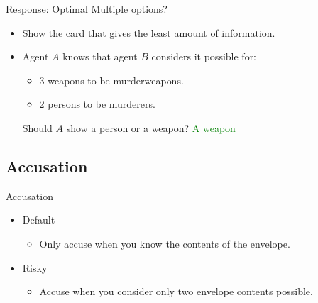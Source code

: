 \begin{frame}{Response: Optimal}
Multiple options?
  \begin{itemize}
  \item Show the card that gives the least amount of information.
  \item Agent $A$ knows that agent $B$ considers it possible for:
  \begin{itemize}
    \item 3 weapons to be murderweapons.
    \item 2 persons to be murderers. 
  \end{itemize}
  Should $A$ show a person or a weapon?  \textcolor{green}{A weapon}
  \end{itemize}
\end{frame}

\subsection{Accusation}
\begin{frame} {Accusation}
\begin{itemize}
  \item Default
  \begin{itemize}
   \item Only accuse when you know the contents of the envelope. 
  \end{itemize}
  
  \item Risky
  \begin{itemize}
  \item Accuse when you consider only two envelope contents possible.
  \end{itemize}

\end{itemize}
\end{frame} 

